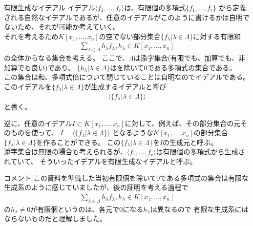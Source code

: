 \begin{frame} {有限生成なイデアル}
	イデアル$\langle f_1, \ldots, f_r \rangle$は、有限個の多項式$\{ f_1, \ldots, f_r \}$
	から定義される自然なイデアルであるが、任意のイデアルがこのように書けるかは自明でないため、それが可能か考えていく。\\
	それを考えるため$K[x_1, \ldots, x_n]$の空でない部分集合$\{f_{\lambda} | \lambda \in \Lambda\}$に対する有限和
	\begin{align*}
		\sum_{\lambda \in \Lambda} h_{\lambda} f_{\lambda}, h_{\lambda} \in K[x_1, \ldots, x_n]
	\end{align*}
	の全体からなる集合を考える。
	ここで、$\Lambda$は添字集合(有限でも、加算でも、非加算でも良い)であり、
	$\{h_{\lambda} | \lambda \in \Lambda\}$はを除いて0である多項式の集合である。\\
	この集合は和、多項式倍について閉じていることは自明なのでイデアルである。\\
	このイデアルを$\{f_{\lambda}|\lambda \in \Lambda\}$が生成するイデアルと呼び
	\begin{align*}
		\langle \{ f_{\lambda} | \lambda \in \Lambda \} \rangle
	\end{align*}
	と書く。

\end{frame}

\begin{frame}
	逆に、任意のイデアル$I \subset K[x_1, \ldots, x_n]$に対して、例えば、その部分集合の元そのものを使って、
	$I=\langle \{  f_{\lambda} | \lambda \in \Lambda \} \rangle$
	となるような$K[x_1, \ldots, x_n]$の部分集合$\{ f_{\lambda} | \lambda \in \Lambda \}$を作ることができる。
	この$\{ f_{\lambda} | \lambda \in \Lambda \}$を$I$の生成元と呼ぶ。\\
	添字集合は無限の場合も考えられるが、$\langle f_1, \ldots, f_r \rangle$は有限個の多項式から生成されていて、
	そういったイデアルを有限生成なイデアルと呼ぶ。\\
	\begin{block} {コメント}
	この資料を準備した当初有限個を除いて0である多項式の集合は有限な生成系のように感じていましたが、後の証明を考える過程で
	\begin{align*}
		\sum_{\lambda \in \Lambda} h_{\lambda} f_{\lambda}, h_{\lambda} \in K[x_1, \ldots, x_n]
	\end{align*}
	の$h_{\lambda} \neq 0$が有限個というのは、各元で0になる$h_{\lambda}$は異なるので
	有限な生成系にはならないものだと理解しました。
	\end{block}
\end{frame}

